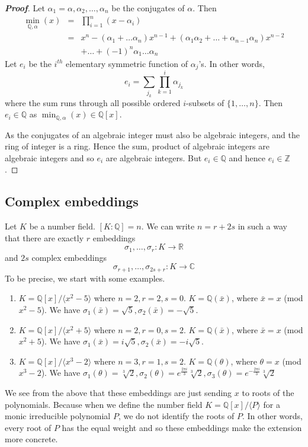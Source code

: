 \begin{proof}[\bf Proof] 
Let $\alpha_1=\alpha,\alpha_2,\ldots,\alpha_n$ be the conjugates of $\alpha$. Then
\begin{eqnarray*}
\min_{\mathbb{Q},\alpha}(x)&=&\prod_{i=1}^n (x-\alpha_i)\\
&=&x^n-(\alpha_1+\ldots \alpha_n)x^{n-1}+(\alpha_1\alpha_2+\ldots+\alpha_{n-1}\alpha_n)x^{n-2}\\
&~&+\ldots+(-1)^n\alpha_1\ldots\alpha_n
\end{eqnarray*}
Let $e_i$ be the $i^{th}$ elementary symmetric function of $\alpha_j$'s. In other words,
$$e_i=\sum_{j_k}\prod_{k=1}^i \alpha_{j_k}$$
where the sum runs through all possible ordered $i$-subsets of $\{1,\ldots,n\}$. Then $e_i \in \mathbb{Q}$ as
$\min_{\mathbb{Q},\alpha}(x) \in \mathbb{Q}[x]$.

As the conjugates of an algebraic integer must also be algebraic integers, and the ring of integer is a ring. Hence the sum, product of algebraic integers are algebraic integers and so $e_i$ are algebraic integers. But $e_i \in \mathbb{Q}$ and hence $e_i \in \mathbb{Z}$.
\end{proof}

\subsection{Complex embeddings}

Let $K$ be a number field. $[K:\mathbb{Q}]=n$. We can write $n=r+2s$ in such a way that there are exactly $r$ embeddings $$\sigma_1,\ldots,\sigma_r :K \rightarrow \mathbb{R}$$ and $2s$ complex embeddings
$$\sigma_{r+1},\ldots,\sigma_{2s+r} :K \rightarrow \mathbb{C}$$
To be precise, we start with some examples.
\begin{example}
\begin{enumerate}
\item $K=\mathbb{Q}[x]/\langle x^2-5 \rangle$ where $n=2,r=2,s=0$. $K=\mathbb{Q}(\bar{x})$, where
$\bar{x}=x$ (mod $x^2-5$). We have $\sigma_1(\bar{x})=\sqrt{5},\sigma_2(\bar{x})=-\sqrt{5}$.
\item $K=\mathbb{Q}[x]/\langle x^2+5 \rangle$ where $n=2,r=0,s=2$. $K=\mathbb{Q}(\bar{x})$, where
$\bar{x}=x$ (mod $x^2+5$). We have $\sigma_1(\bar{x})=i\sqrt{5},\sigma_2(\bar{x})=-i\sqrt{5}$.
\item $K=\mathbb{Q}[x]/\langle x^3-2 \rangle$ where $n=3,r=1,s=2$. $K=\mathbb{Q}(\theta)$, where
$\theta=x$ (mod $x^3-2$). We have $\sigma_1(\theta)=\sqrt[3]{2},\sigma_2(\theta)=e^{\frac{2\pi i}{3}}\sqrt[3]{2}, \sigma_3(\theta)=e^{-\frac{2\pi i}{3}} \sqrt[3]{2}$
\end{enumerate}
\end{example}
We see from the above that these embeddings are just sending $x$ to roots of the polynomials. Because when we define the number field $K=\mathbb{Q}[x]/\langle P \rangle$ for a monic irreducible polynomial $P$, we do not identify the roots of $P$. In other words, every root of $P$ has the equal weight and so these embeddings make the extension more concrete.

